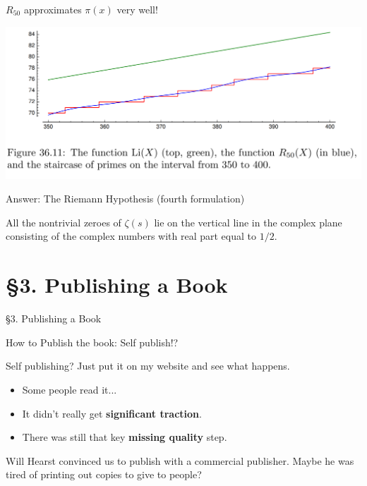 \documentclass{beamer}
\newcommand{\mysection}[2]{\section{\S#1. #2}%
\begin{frame}{}
\vfill
\begin{center}
\hrulefill
\vfill
\Huge\sc \S#1. #2
\vfill
\hrulefill
\end{center}
\vfill
\end{frame}}
\begin{document}
\begin{frame}{$R_{50}$ approximates $\pi(x)$ very well!}

  \includegraphics[height=.55\textheight]{pics/Li-R50-pi}

\end{frame}



\begin{frame}{Answer: The Riemann Hypothesis (fourth formulation)}
  \begin{block}{}
    All the nontrivial zeroes of $\zeta(s)$ lie on the vertical
    line in the complex plane consisting of the
    complex numbers with real part equal to $1/2$.
  \end{block}
\end{frame}


\mysection{3}{Publishing a Book}

\begin{frame}{How to Publish the book:  Self publish!?}
  \begin{block}{Self publishing?}
    Just put it on my website and see what happens.
    \begin{itemize}
      \item Some people read it...
      \item It didn't really get \textbf{significant traction}.
      \item There was still that key \textbf{missing quality} step.
    \end{itemize}
  \end{block}
  \vfill
  Will Hearst convinced us to publish with a commercial publisher.
  Maybe he was tired of printing out copies to give to people?
\end{frame}
\end{document}
